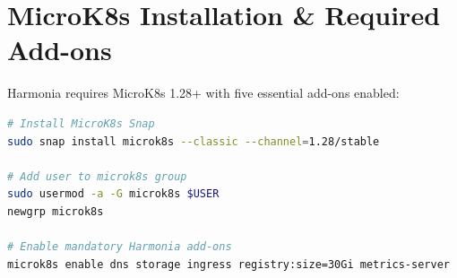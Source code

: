 \section{MicroK8s Installation \& Required Add-ons}

Harmonia requires MicroK8s 1.28+ with five essential add-ons enabled:
\begin{lstlisting}[language=bash, caption={MicroK8s Setup and Add-on Activation Commands}]
# Install MicroK8s Snap
sudo snap install microk8s --classic --channel=1.28/stable

# Add user to microk8s group
sudo usermod -a -G microk8s $USER
newgrp microk8s

# Enable mandatory Harmonia add-ons
microk8s enable dns storage ingress registry:size=30Gi metrics-server
\end{lstlisting}

\newpage
